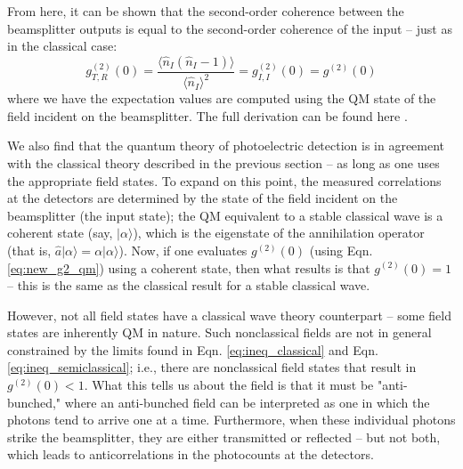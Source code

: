 \documentclass[twocolumn,amsmath,amssymb,pra]{revtex4-2}
\begin{document}
From here, it can be shown that the second-order coherence between the beamsplitter outputs is equal to the second-order coherence of the input -- just as in the classical case:
\begin{equation}
    g_{T, R}^{( 2 )} (0)
    =
    \frac{ \langle \hat{n}_{I} ( \hat{n}_{I} - 1 ) \rangle }{ \langle \hat{n}_{I} \rangle^{2} }
    =
    g_{I, I}^{(2)}(0)
    =
    g^{(2)}(0)
    \label{eq:new_g2_qm}
\end{equation}
where we have the expectation values are computed using the QM state of the field incident on the beamsplitter. The full derivation can be found here \cite{T_N}.

We also find that the quantum theory of photoelectric detection is in agreement with the classical theory described in the previous section -- as long as one uses the appropriate field states. To expand on this point, the measured correlations at the detectors are determined by the state of the field incident on the beamsplitter (the input state); the QM equivalent to a stable classical wave is a coherent state (say, $\vert \alpha \rangle$), which is the eigenstate of the annihilation operator (that is, $\hat{a} \vert \alpha \rangle = \alpha \vert \alpha \rangle$). Now, if one evaluates $g^{(2)}(0)$ (using Eqn. \ref{eq:new_g2_qm}) using a coherent state, then what results is that $g^{(2)}(0) = 1$ -- this is the same as the classical result for a stable classical wave.

However, not all field states have a classical wave theory counterpart -- some field states are inherently QM in nature. Such nonclassical fields are not in general constrained by the limits found in Eqn. \ref{eq:ineq_classical} and Eqn. \ref{eq:ineq_semiclassical}; i.e., there are nonclassical field states that result in $g^{(2)}(0) < 1$. What this tells us about the field is that it must be "anti-bunched," where an anti-bunched field can be interpreted as one in which the photons tend to arrive one at a time. Furthermore, when these individual photons strike the beamsplitter, they are either transmitted or reflected -- but not both, which leads to anticorrelations in the photocounts at the detectors.
\end{document}
